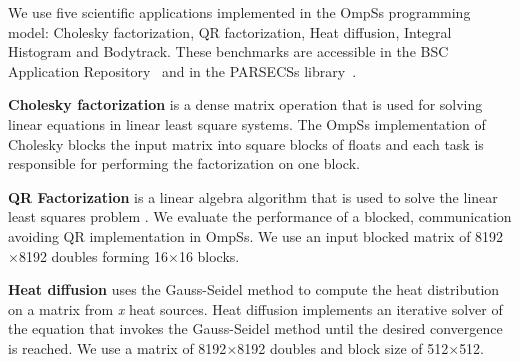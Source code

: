 We use five scientific applications implemented in the OmpSs programming model: Cholesky factorization, QR factorization, Heat diffusion, Integral Histogram and Bodytrack. These benchmarks are accessible in the BSC Application Repository~\cite{BAR} and in the PARSECSs library~\cite{Chasapis:TACO2016}. 

\textbf{Cholesky factorization} is a dense matrix operation that is used for solving linear equations in linear least square systems.
The OmpSs implementation of Cholesky blocks the input matrix into square blocks of floats and each task is responsible for performing the factorization on one block.

\textbf{QR Factorization} is a linear algebra algorithm that is used to solve the linear least squares problem \cite{QR}. 
We evaluate the performance of a blocked, communication avoiding QR implementation in OmpSs. 
We use an input blocked matrix of 8192$\times$8192 doubles forming 16$\times$16 blocks.

\textbf{Heat diffusion} uses the Gauss-Seidel method to compute the heat distribution on a matrix from \textit{x} heat sources. Heat diffusion implements an iterative solver of the equation that invokes the Gauss-Seidel method until the desired convergence is reached. We use a matrix of 8192$\times$8192 doubles and block size of 512$\times$512.


